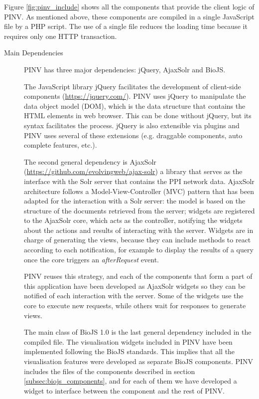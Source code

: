 Figure \ref{fig:pinv_include} shows all the components that provide the client logic of PINV. As mentioned above, these components are compiled in a single JavaScript file by a PHP script. The use of a single file reduces the loading time because it requires only one HTTP transaction. 

\begin{description}
\item[Main Dependencies] 
PINV has three major dependencies: jQuery, AjaxSolr and BioJS. 

The JavaScript library jQuery  facilitates the development of client-side components (\url{https://jquery.com/}). PINV uses jQuery to manipulate the data object model (DOM), which is the data structure that contains the HTML elements in web browser. This can be done without jQuery, but its syntax facilitates the process. jQuery is also extensible via plugins and PINV uses several of these extensions (e.g. draggable components, auto complete features, etc.).

The second general dependency is AjaxSolr (\url{https://github.com/evolvingweb/ajax-solr}) a library that serves as the interface with the Solr server that contains the PPI network data. AjaxSolr architecture follows a Model-View-Controller (MVC) pattern that has been adapted for the interaction with a Solr server: the model is based on the structure of the documents retrieved from the server; widgets are registered to the AjaxSolr core, which acts as the controller, notifying the widgets about the actions and results of interacting with the server. Widgets are in charge of generating the views, because they can include methods to react according to each notification, for example to display the results of a query once the core triggers an \emph{afterRequest} event. 

PINV reuses this strategy, and each of the components that form a part of this application have been developed as AjaxSolr widgets so they can be notified of each interaction with the server. Some of the widgets use the core to execute new requests, while others wait for responses to generate views.

The main class of BioJS 1.0 is the last general dependency included in the compiled file. The visualisation widgets included in PINV have been implemented following the BioJS standards. This implies that all the visualisation features were developed as separate BioJS components. PINV includes the files of the components described in section \ref{subsec:biojs_components}, and for each of them we have developed a widget to interface between the component and the rest of PINV.


\end{description}
